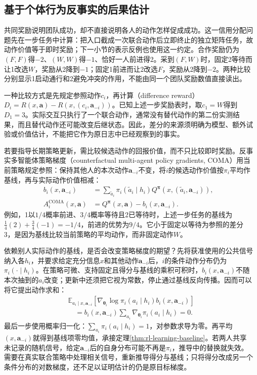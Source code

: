 \subsection{基于个体行为反事实的后果估计}
\label{sec:rl-multi-agent-counterfactual}

共同奖励说明团队成功，却不直接说明各人的动作怎样促成成功。这一信用分配问题先在一步任务中计算：把入口截成一次联合动作后立即终止的独立矩阵任务，故动作价值等于即时奖励；下一小节的表示反例也使用这一约定。合作奖励仍为$(F,F)$得$-2$、$(W,W)$得$-1$、恰好一人前进得2。采到$(F,W)$时，固定2等待而让1改选$W$，奖励从2降到$-1$；固定1前进而让2改选$F$，奖励从2降到$-2$。两种比较分别显示1启动通行和2避免冲突的作用，不能由同一个团队奖励数值直接读出。

一种比较方式是先规定参照动作$c_i$，再计算（difference reward）
$D_i=R(x,\bm a)-R(x,(c_i,\bm a_{-i}))$。已知上述一步奖励表时，取$c_1=W$得到$D_1=3$。实际交互只执行了一个联合动作，通常没有替代动作的第二份实测结果，而且替代动作还可能改变后继状态。因此，差分的来源须明确为模型、额外试验或价值估计，不能把它作为原日志中已经观察到的事实。

若要指导长期策略更新，需比较候选动作的回报价值，而不只比较即时奖励。反事实多智能体策略梯度（counterfactual multi-agent policy gradients, COMA）用当前策略规定参照：保持其他人的本次动作$\bm a_{-i}$不变，将$i$的候选动作价值按$\pi_i$平均作基线，再与实际动作价值相减：
\begin{align}
 b_i(x,\bm a_{-i})
 &=\sum_{\tilde a_i}\pi_i(\tilde a_i\mid h_i)
       Q^{\bm\pi}(x,(\tilde a_i,\bm a_{-i})),\\
 A_i^{\text{COMA}}(x,\bm a)
 &=Q^{\bm\pi}(x,\bm a)-b_i(x,\bm a_{-i}).
 \label{eq:rl-multi-agent-coma}
\end{align}
例如，1以$1/4$概率前进、$3/4$概率等待且2已等待时，上述一步任务的基线为
$\tfrac14(2)+\tfrac34(-1)=-1/4$，前进的优势为$9/4$。它小于固定以等待为参照的差分3，是因为基线比较当前策略的平均动作，而非固定动作$W$。

依赖别人实际动作的基线，是否会改变策略梯度的期望？先将获准使用的公共信号纳入各$h_i$，并要求给定充分信息$x$和其他动作$\bm a_{-i}$后，$i$的条件动作分布仍为$\pi_i(\cdot\mid h_i)$。在策略可微、支持固定且得分与基线的乘积可积时，$b_i(x,\bm a_{-i})$不随本次抽到的$a_i$改变；更新中还须把它视为常数，停止通过基线反向传播。因而可以将它提出动作求和：
\begin{align}
 &\mathbb E_{a_i\mid x,\bm a_{-i}}
   [\nabla_{\bm\theta_i}\log\pi_i(a_i\mid h_i)b_i(x,\bm a_{-i})]\nonumber\\
 &\quad=b_i(x,\bm a_{-i})
       \sum_{a_i}\nabla_{\bm\theta_i}\pi_i(a_i\mid h_i)=0.
 \label{eq:rl-multi-agent-baseline-zero}
\end{align}
最后一步使用概率归一化：$\sum_{a_i}\pi_i(a_i\mid h_i)=1$，对参数求导为零。再平均$(x,\bm a_{-i})$就得到基线项零均值，承接定理\ref{thm:rl-learning-baseline}。若两人共享未记录的随机信号，给定$\bm a_{-i}$后的自身分布可能不再是$\pi_i$，推导中的替换就失效。需要在真实联合策略中处理相关信号，重新推导得分与基线；只将得分改成另一个条件分布的对数梯度，还不足以证明估计的仍是原目标梯度。

